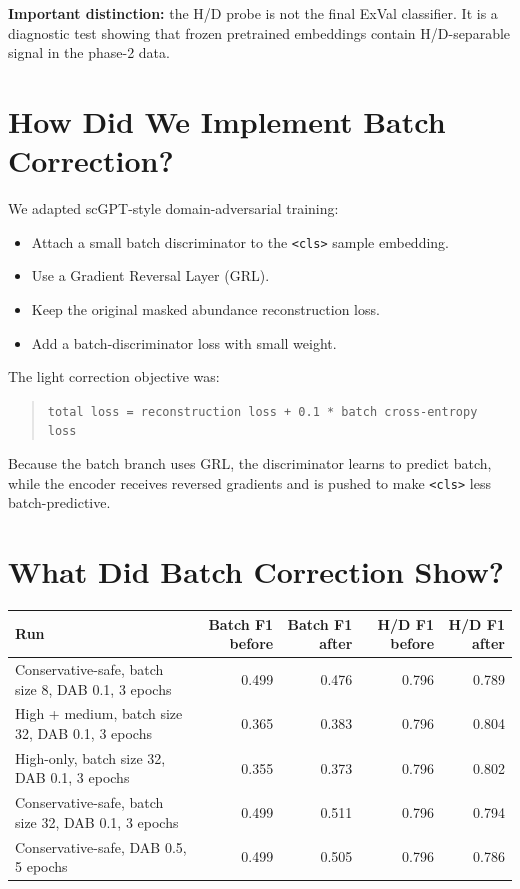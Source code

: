 \documentclass[11pt]{article}
\newcommand{\code}[1]{\texttt{\small #1}}
\begin{document}
\textbf{Important distinction:} the H/D probe is not the final ExVal classifier. It is a
diagnostic test showing that frozen pretrained embeddings contain H/D-separable signal in
the phase-2 data.

\section{How Did We Implement Batch Correction?}

We adapted scGPT-style domain-adversarial training:

\begin{itemize}
  \item Attach a small batch discriminator to the \code{<cls>} sample embedding.
  \item Use a Gradient Reversal Layer (GRL).
  \item Keep the original masked abundance reconstruction loss.
  \item Add a batch-discriminator loss with small weight.
\end{itemize}

The light correction objective was:

\begin{quote}
\code{total loss = reconstruction loss + 0.1 * batch cross-entropy loss}
\end{quote}

Because the batch branch uses GRL, the discriminator learns to predict batch, while the
encoder receives reversed gradients and is pushed to make \code{<cls>} less
batch-predictive.

\section{What Did Batch Correction Show?}

\begin{center}
\small
\begin{tabular}{p{}rrrr}
\toprule
Run & Batch F1 before & Batch F1 after & H/D F1 before & H/D F1 after \\
\midrule
Conservative-safe, batch size 8, DAB 0.1, 3 epochs & 0.499 & 0.476 & 0.796 & 0.789 \\
High + medium, batch size 32, DAB 0.1, 3 epochs & 0.365 & 0.383 & 0.796 & 0.804 \\
High-only, batch size 32, DAB 0.1, 3 epochs & 0.355 & 0.373 & 0.796 & 0.802 \\
Conservative-safe, batch size 32, DAB 0.1, 3 epochs & 0.499 & 0.511 & 0.796 & 0.794 \\
Conservative-safe, DAB 0.5, 5 epochs & 0.499 & 0.505 & 0.796 & 0.786 \\
\bottomrule
\end{tabular}
\end{center}
\end{document}
